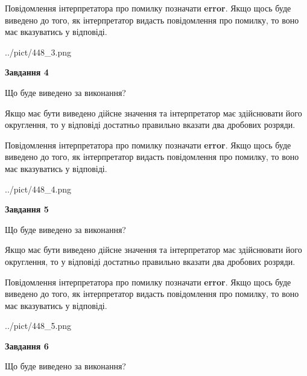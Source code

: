 \documentclass[12pt, ukrainian]{article}
\begin{document}
{\begin {Large}
Повідомлення інтерпретатора про помилку позначати \textbf{error}.
Якщо щось буде виведено до того, як інтерпретатор видасть повідомлення про помилку, 
то воно має вказуватись у відповіді. \par

\begin{center}
	{../pict/448_3.png}
\end{center}
\newpage

{\begin {center}\textbf{Завдання 4}\end {center}}\par
Що буде виведено за виконання? \par

Якщо має бути виведено дійсне значення та інтерпретатор має здійснювати його округлення, 
то у відповіді достатньо правильно вказати два дробових розряди.

Повідомлення інтерпретатора про помилку позначати \textbf{error}.
Якщо щось буде виведено до того, як інтерпретатор видасть повідомлення про помилку, 
то воно має вказуватись у відповіді. \par

\begin{center}
	{../pict/448_4.png}
\end{center}
\newpage

{\begin {center}\textbf{Завдання 5}\end {center}}\par
Що буде виведено за виконання? \par

Якщо має бути виведено дійсне значення та інтерпретатор має здійснювати його округлення, 
то у відповіді достатньо правильно вказати два дробових розряди.

Повідомлення інтерпретатора про помилку позначати \textbf{error}.
Якщо щось буде виведено до того, як інтерпретатор видасть повідомлення про помилку, 
то воно має вказуватись у відповіді. \par

\begin{center}
	{../pict/448_5.png}
\end{center}
\newpage

{\begin {center}\textbf{Завдання 6}\end {center}}\par
Що буде виведено за виконання? \par


\end{Large}}
\end{document}
